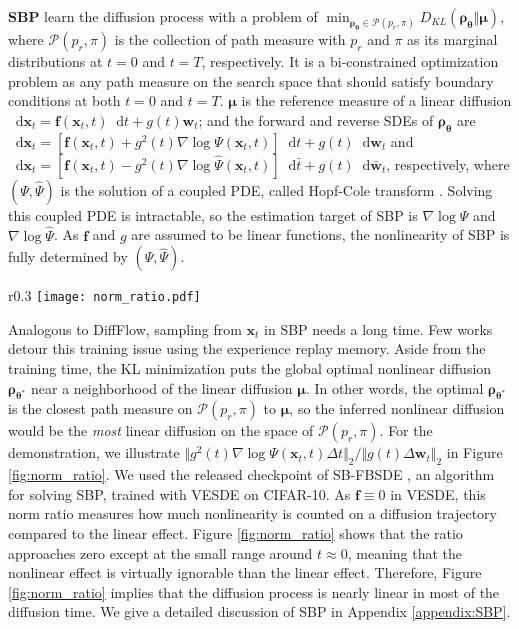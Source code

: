 \documentclass{article}
\theoremstyle{definition}
\theoremstyle{remark}
\newcommand*\diff{\mathop{}\!\mathrm{d}}
\begin{document}
	\textbf{SBP} \citet{de2021diffusion} learn the diffusion process with a problem of $\min_{\bm{\rho}_{\bm{\theta}}\in\mathcal{P}(p_{r},\pi)}D_{KL}(\bm{\rho}_{\bm{\theta}}\Vert\bm{\mu})$, where $\mathcal{P}(p_{r},\pi)$ is the collection of path measure with $p_{r}$ and $\pi$ as its marginal distributions at $t=0$ and $t=T$, respectively. It is a bi-constrained optimization problem as any path measure on the search space that should satisfy boundary conditions at both $t=0$ and $t=T$. $\bm{\mu}$ is the reference measure of a linear diffusion $\diff\mathbf{x}_{t}=\mathbf{f}(\mathbf{x}_{t},t)\diff t+g(t)\mathbf{w}_{t}$; and the forward and reverse SDEs of $\bm{\rho}_{\bm{\theta}}$ are $\diff\mathbf{x}_{t}=[\mathbf{f}(\mathbf{x}_{t},t)+g^{2}(t)\nabla\log{\Psi(\mathbf{x}_{t},t)}]\diff t+g(t)\diff\mathbf{w}_{t}$ and $\diff\mathbf{x}_{t}=[\mathbf{f}(\mathbf{x}_{t},t)-g^{2}(t)\nabla\log{\hat{\Psi}(\mathbf{x}_{t},t)}]\diff \bar{t}+g(t)\diff\mathbf{\bar{w}}_{t}$, respectively, where $(\Psi,\hat{\Psi})$ is the solution of a coupled PDE, called Hopf-Cole transform \cite{leger2021hopf}. Solving this coupled PDE is intractable, so the estimation target of SBP is $\nabla\log{\Psi}$ and $\nabla\log{\hat{\Psi}}$. As $\mathbf{f}$ and $g$ are assumed to be linear functions, the nonlinearity of SBP is fully determined by $(\Psi,\hat{\Psi})$. 
		
	\begin{wrapfigure}{r}{0.3\textwidth}
		\vskip -0.2in
		\centering
		\texttt{[image: norm\_ratio.pdf]}
		\vskip -0.1in
		\caption{Norm Ratio of SBP.}
		\label{fig:norm_ratio}
		\vskip -0.2in
	\end{wrapfigure}
	Analogous to DiffFlow, sampling from $\mathbf{x}_{t}$ in SBP needs a long time. Few works \cite{de2021diffusion,chen2021likelihood} detour this training issue using the experience replay memory. Aside from the training time, the KL minimization puts the global optimal nonlinear diffusion $\bm{\rho}_{\bm{\theta}^{*}}$ near a neighborhood of the linear diffusion $\bm{\mu}$. In other words, the optimal $\bm{\rho}_{\bm{\theta}^{*}}$ is the closest path measure on $\mathcal{P}(p_{r},\pi)$ to $\bm{\mu}$, so the inferred nonlinear diffusion would be the \textit{most} linear diffusion on the space of $\mathcal{P}(p_{r},\pi)$. For the demonstration, we illustrate $\Vert g^{2}(t)\nabla\log{\Psi(\mathbf{x}_{t},t)}\Delta t\Vert_{2}/\Vert g(t)\Delta\mathbf{w}_{t}\Vert_{2}$ in Figure \ref{fig:norm_ratio}. We used the released checkpoint of SB-FBSDE \cite{chen2021likelihood}, an algorithm for solving SBP, trained with VESDE on CIFAR-10. As $\mathbf{f}\equiv 0$ in VESDE, this norm ratio measures how much nonlinearity is counted on a diffusion trajectory compared to the linear effect. Figure \ref{fig:norm_ratio} shows that the ratio approaches zero except at the small range around $t\approx 0$, meaning that the nonlinear effect is virtually ignorable than the linear effect. Therefore, Figure \ref{fig:norm_ratio} implies that the diffusion process is nearly linear in most of the diffusion time. We give a detailed discussion of SBP in Appendix \ref{appendix:SBP}.
	
\end{document}
